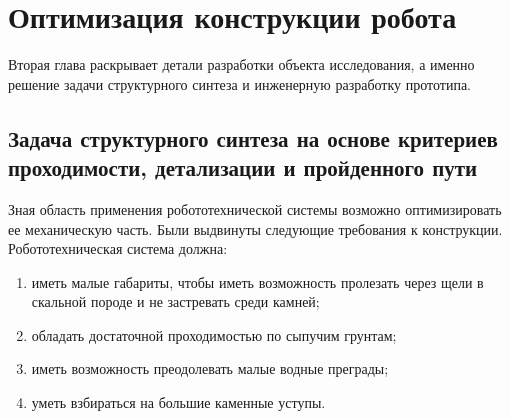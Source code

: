 \chapter{Оптимизация конструкции робота}\label{ch:ch2}

Вторая глава раскрывает детали разработки объекта исследования, а именно решение задачи структурного синтеза и инженерную разработку прототипа.

\section{Задача структурного синтеза на основе критериев проходимости, детализации и пройденного пути}

Зная область применения робототехнической системы возможно оптимизировать ее механическую часть. Были выдвинуты следующие требования к конструкции. Робототехническая система должна:
\begin{enumerate}
    \item иметь малые габариты, чтобы иметь возможность пролезать через щели в скальной породе и не застревать среди камней;
    \item обладать достаточной проходимостью по сыпучим грунтам;
    \item иметь возможность преодолевать малые водные преграды;
    \item уметь  взбираться на большие каменные уступы.
\end{enumerate}

